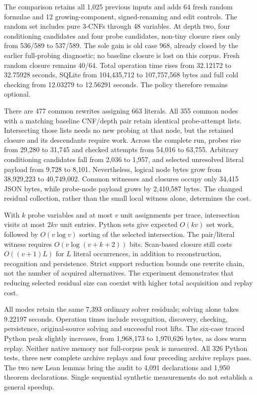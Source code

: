 \documentclass[11pt,a4paper]{article}
\numberwithin{equation}{section}
\theoremstyle{plain}
\theoremstyle{definition}
\theoremstyle{remark}
\begin{document}
The comparison retains all 1,025 previous inputs and adds 64 fresh random formulae and 12 growing-component, signed-renaming and edit controls. The random set includes pure 3-CNFs through 48 variables. At depth two, four conditioning candidates and four probe candidates, non-tiny closure rises only from 536/589 to 537/589. The sole gain is old case 968, already closed by the earlier full-probing diagnostic; no baseline closure is lost on this corpus. Fresh random closure remains 40/64. Total operation time rises from 32.12172 to 32.75928 seconds, SQLite from 104,435,712 to 107,757,568 bytes and full cold checking from 12.03279 to 12.56291 seconds. The policy therefore remains optional.

There are 477 common rewrites assigning 663 literals. All 355 common nodes with a matching baseline CNF/depth pair retain identical probe-attempt lists. Intersecting those lists needs no new probing at that node, but the retained closure and its descendants require work. Across the complete run, probes rise from 29,280 to 31,745 and checked attempts from 54,016 to 63,755. Arbitrary conditioning candidates fall from 2,036 to 1,957, and selected unresolved literal payload from 9,728 to 8,101. Nevertheless, logical node bytes grow from 38,929,223 to 40,749,002. Common witnesses and closures occupy only 34,415 JSON bytes, while probe-node payload grows by 2,410,587 bytes. The changed residual collection, rather than the small local witness alone, determines the cost.

With $k$ probe variables and at most $v$ unit assignments per trace, intersection visits at most $2kv$ unit entries. Python sets give expected $O(kv)$ set work, followed by $O(v\log v)$ sorting of the selected intersection. The pair/literal witness requires $O(v\log(v+k+2))$ bits. Scan-based closure still costs $O((v+1)L)$ for $L$ literal occurrences, in addition to reconstruction, recognition and persistence. Strict support reduction bounds one rewrite chain, not the number of acquired alternatives. The experiment demonstrates that reducing selected residual size can coexist with higher total acquisition and replay cost.

All modes retain the same 7,393 ordinary solver residuals; solving alone takes 9.22197 seconds. Operation times include recognition, discovery, checking, persistence, original-source solving and successful root lifts. The six-case traced Python peak slightly increases, from 1,968,173 to 1,970,626 bytes, as does warm replay. Neither native memory nor full-corpus peak is measured. All 326 Python tests, three new complete archive replays and four preceding archive replays pass. The two new Lean lemmas bring the audit to 4,091 declarations and 1,950 theorem declarations. Single sequential synthetic measurements do not establish a general speedup.
\end{document}
